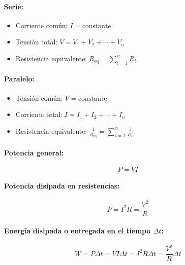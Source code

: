 \begin{tcolorbox}[title=Circuitos]
  \paragraph{Serie:}
  \begin{itemize}
    \item Corriente común: \( I = \text{constante} \)
    \item Tensión total: \( V = V_1 + V_2 + \cdots + V_n \)
    \item Resistencia equivalente: \(R_{\text{eq}} = \sum_{i=1}^{n} R_i\)
  \end{itemize}
  
  \paragraph{Paralelo:}
  \begin{itemize}
    \item Tensión común: \( V = \text{constante} \)
    \item Corriente total: \( I = I_1 + I_2 + \cdots + I_n \)
    \item Resistencia equivalente: \(\frac{1}{R_{\text{eq}}} = \sum_{i=1}^{n} \frac{1}{R_i}\)
  \end{itemize}
\end{tcolorbox}


\begin{tcolorbox}[title=Trabajo y Potencia eléctrica]
  \paragraph{Potencia general:}  
  
  \[
    P = V I
  \]
  
  \paragraph{Potencia disipada en resistencias:}  
  \[
    P = I^2 R = \frac{V^2}{R}
  \]
  
  \paragraph{Energía disipada o entregada en el tiempo \( \Delta t \):}
  \[
    W = P \Delta t = V I \Delta t = I^2 R \Delta t = \frac{V^2}{R} \Delta t
  \]
\end{tcolorbox}
